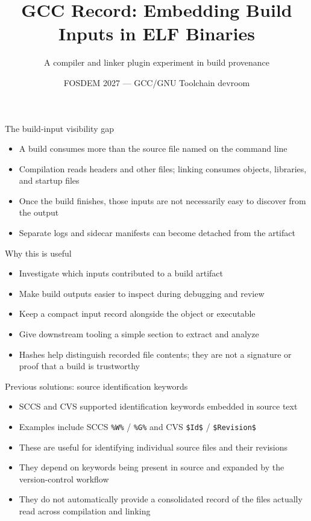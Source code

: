 \documentclass[aspectratio=169]{beamer}
\title{GCC Record: Embedding Build Inputs in ELF Binaries}
\subtitle{A compiler and linker plugin experiment in build provenance}
\date{FOSDEM 2027 --- GCC/GNU Toolchain devroom}
\begin{document}
\begin{frame}
  \titlepage
\end{frame}

\begin{frame}{The build-input visibility gap}
  \begin{itemize}
    \item A build consumes more than the source file named on the command line
    \item Compilation reads headers and other files; linking consumes objects, libraries, and startup files
    \item Once the build finishes, those inputs are not necessarily easy to discover from the output
    \item Separate logs and sidecar manifests can become detached from the artifact
  \end{itemize}
\end{frame}

\begin{frame}{Why this is useful}
  \begin{itemize}
    \item Investigate which inputs contributed to a build artifact
    \item Make build outputs easier to inspect during debugging and review
    \item Keep a compact input record alongside the object or executable
    \item Give downstream tooling a simple section to extract and analyze
    \item Hashes help distinguish recorded file contents; they are not a signature or proof that a build is trustworthy
  \end{itemize}
\end{frame}

\begin{frame}{Previous solutions: source identification keywords}
  \begin{itemize}
    \item SCCS and CVS supported identification keywords embedded in source text
    \item Examples include SCCS \texttt{\%W\%} / \texttt{\%G\%} and CVS \texttt{\$Id\$} / \texttt{\$Revision\$}
    \item These are useful for identifying individual source files and their revisions
    \item They depend on keywords being present in source and expanded by the version-control workflow
    \item They do not automatically provide a consolidated record of the files actually read across compilation and linking
  \end{itemize}
\end{frame}
\end{document}
